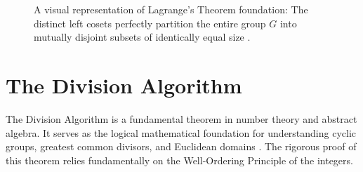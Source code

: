 \documentclass[11pt]{article}
\theoremstyle{definition}
\theoremstyle{plain}
\theoremstyle{remark}
\begin{document}
\begin{figure}[H]
    \centering
    \caption{A visual representation of Lagrange's Theorem foundation: The distinct left cosets perfectly partition the entire group $G$ into mutually disjoint subsets of identically equal size \cite{fraleigh}.}
    \label{fig:coset_partition}
\end{figure}



















\appendix
\section{The Division Algorithm}

The Division Algorithm is a fundamental theorem in number theory and abstract algebra. It serves as the logical mathematical foundation for understanding cyclic groups, greatest common divisors, and Euclidean domains \cite{dummit, gallian}. The rigorous proof of this theorem relies fundamentally on the Well-Ordering Principle of the integers.
\end{document}
